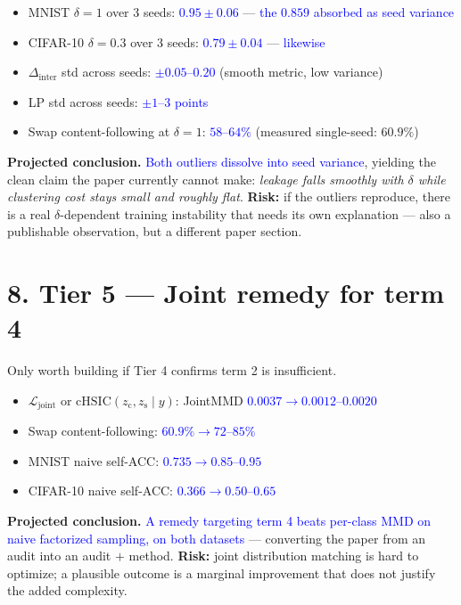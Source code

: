 \documentclass[10pt,letterpaper]{article}
\newcommand{\pj}[1]{\textcolor{blue}{#1}}
\newcommand{\zc}{z_{\mathrm{c}}}
\newcommand{\zs}{z_{\mathrm{s}}}
\begin{document}
\begin{itemize}
  \item MNIST $\delta{=}1$ over 3 seeds: \pj{$0.95\pm0.06$} --- \pj{the $0.859$ absorbed as seed variance}
  \item CIFAR-10 $\delta{=}0.3$ over 3 seeds: \pj{$0.79\pm0.04$} --- \pj{likewise}
  \item $\Delta_{\mathrm{inter}}$ std across seeds: \pj{$\pm0.05$--$0.20$} (smooth metric, low variance)
  \item LP std across seeds: \pj{$\pm1$--$3$ points}
  \item Swap content-following at $\delta{=}1$: \pj{$58$--$64\%$} (measured single-seed: $60.9\%$)
\end{itemize}

\textbf{Projected conclusion.} \pj{Both outliers dissolve into seed
variance}, yielding the clean claim the paper currently cannot make:
\emph{leakage falls smoothly with $\delta$ while clustering cost stays small
and roughly flat}. \textbf{Risk:} if the outliers reproduce, there is a real
$\delta$-dependent training instability that needs its own explanation ---
also a publishable observation, but a different paper section.

\section*{8. Tier 5 --- Joint remedy for term 4}

Only worth building if Tier 4 confirms term 2 is insufficient.

\begin{itemize}
  \item $\mathcal L_{\mathrm{joint}}$ or $\mathrm{cHSIC}(\zc,\zs\mid y)$: JointMMD \pj{$0.0037\to0.0012$--$0.0020$}
  \item Swap content-following: \pj{$60.9\%\to72$--$85\%$}
  \item MNIST naive self-ACC: \pj{$0.735\to0.85$--$0.95$}
  \item CIFAR-10 naive self-ACC: \pj{$0.366\to0.50$--$0.65$}
\end{itemize}

\textbf{Projected conclusion.} \pj{A remedy targeting term 4 beats per-class
MMD on naive factorized sampling, on both datasets} --- converting the paper
from an audit into an audit $+$ method. \textbf{Risk:} joint distribution
matching is hard to optimize; a plausible outcome is a marginal improvement
that does not justify the added complexity.
\end{document}
